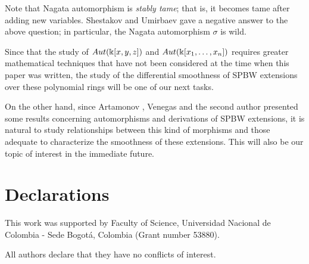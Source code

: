 \documentclass{amsart}
\theoremstyle{definition}
\theoremstyle{remark}
\numberwithin{equation}{section}
\begin{document}
Note that Nagata automorphism is {\em stably tame}; that is, it becomes tame after adding new variables. Shestakov and Umirbaev \cite{ShestakovUmirbaev2003} gave a negative answer to the above question; in particular, the Nagata automorphism $\sigma$ is wild.

Since that the study of ${\rm Aut}(\Bbbk[x, y, z])$ and ${\rm Aut}(\Bbbk[x_1, \dotsc, x_n])$ requires greater mathematical techniques that have not been considered at the time when this paper was written, the study of the differential smoothness of SPBW extensions over these polynomial rings will be one of our next tasks.

On the other hand, since Artamonov \cite{Artamonov2015}, Venegas \cite{Venegas2015} and the second author \cite{ReyesSuarez2017} presented some results concerning automorphisms and derivations of SPBW extensions, it is natural to study relationships between this kind of morphisms and those adequate to characterize the smoothness of these extensions. This will also be our topic of interest in the immediate future. 



\section{Declarations}\label{}

This work was supported by Faculty of Science, Universidad Nacional de Colombia - Sede Bogot\'a, Colombia (Grant number 53880).

All authors declare that they have no conflicts of interest.
\end{document}
